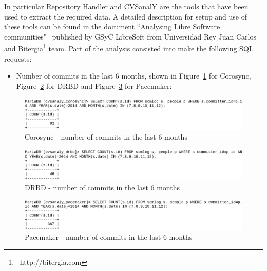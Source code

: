 \documentclass[a4paper, 12pt]{book}
\begin{document}
\noindent In particular Repository Handler and CVSanalY are the tools that have been used to extract the required data. A detailed description for setup and use of these tools can be found in the document ``Analysing Libre Software communities"~\cite{IandR} published by GSyC LibreSoft from Universidad Rey Juan Carlos and Bitergia\footnote{{\tiny\ http://bitergia.com}} team. Part of the analysis consisted into make the following SQL requests:

\begin{itemize}
      \item Number of commits in the last 6 months, shown in Figure~\ref{fig:fig8-1} for Corosync, Figure~\ref{fig:fig8-2} for DRBD and Figure~\ref{fig:fig8-3} for Pacemaker:
\end{itemize}

    \begin{figure}[H]
      \centering
      \includegraphics[scale=0.30]{fig8-1.png}
      \caption[Commits in the last 6 months for Corosync]{Corosync - number of commits in the last 6 months}
      \label{fig:fig8-1}
    \end{figure}
	  
    \begin{figure}[H]
      \centering
      \includegraphics[scale=0.30]{fig8-2.png}
      \caption[Commits in the last 6 months for DRBD]{DRBD - number of commits in the last 6 months}
      \label{fig:fig8-2}
    \end{figure}
    
    \begin{figure}[H]
      \centering
      \includegraphics[scale=0.30]{fig8-3.png}
      \caption[Commits in the last 6 months for Pacemaker]{Pacemaker - number of commits in the last 6 months}
      \label{fig:fig8-3}
    \end{figure}
\end{document}
